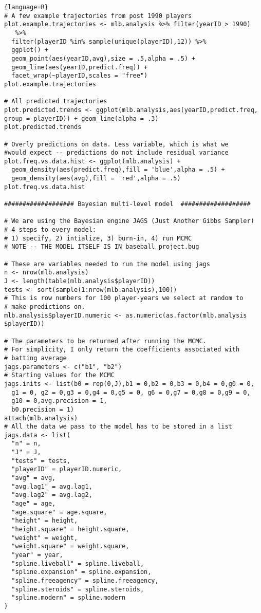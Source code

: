 \documentclass[10pt,a4paper]{article}
\begin{document}
\begin{lstlisting}{language=R}
# A few example trajectories from post 1990 players
plot.example.trajectories <- mlb.analysis %>% filter(yearID > 1990) 
   %>%
  filter(playerID %in% sample(unique(playerID),12)) %>%
  ggplot() +
  geom_point(aes(yearID,avg),size = .5,alpha = .5) +
  geom_line(aes(yearID,predict.freq)) +
  facet_wrap(~playerID,scales = "free")
plot.example.trajectories

# All predicted trajectories
plot.predicted.trends <- ggplot(mlb.analysis,aes(yearID,predict.freq, 
group = playerID)) + geom_line(alpha = .3) 
plot.predicted.trends

# Overly predictions on data. Less variable, which is what we 
#would expect -- predictions do not include residual variance
plot.freq.vs.data.hist <- ggplot(mlb.analysis) + 
  geom_density(aes(predict.freq),fill = 'blue',alpha = .5) +
  geom_density(aes(avg),fill = 'red',alpha = .5)
plot.freq.vs.data.hist

################### Bayesian multi-level model  ###################

# We are using the Bayesian engine JAGS (Just Another Gibbs Sampler)
# 4 steps to every model:
# 1) specify, 2) intialize, 3) burn-in, 4) run MCMC
# NOTE -- THE MODEL ITSELF IS IN baseball_project.bug

# These are variables needed to run the model using jags
n <- nrow(mlb.analysis)
J <- length(table(mlb.analysis$playerID))
tests <- sort(sample(1:nrow(mlb.analysis),100)) 
# This is row numbers for 100 player-years we select at random to 
# make predictions on.
mlb.analysis$playerID.numeric <- as.numeric(as.factor(mlb.analysis
$playerID))

# The parameters to be returned after running the MCMC. 
# For simplicity, I only return the coefficients associated with 
# batting average
jags.parameters <- c("b1", "b2") 
# Starting values for the MCMC
jags.inits <- list(b0 = rep(0,J),b1 = 0,b2 = 0,b3 = 0,b4 = 0,g0 = 0, 
  g1 = 0, g2 = 0,g3 = 0,g4 = 0,g5 = 0, g6 = 0,g7 = 0,g8 = 0,g9 = 0, 
  g10 = 0,avg.precision = 1, 
  b0.precision = 1)
attach(mlb.analysis)
# All the data we pass to the model has to be stored in a list
jags.data <- list(
  "n" = n,
  "J" = J,
  "tests" = tests,
  "playerID" = playerID.numeric,
  "avg" = avg,
  "avg.lag1" = avg.lag1,
  "avg.lag2" = avg.lag2,
  "age" = age,
  "age.square" = age.square,
  "height" = height,
  "height.square" = height.square,
  "weight" = weight,
  "weight.square" = weight.square,
  "year" = year,
  "spline.liveball" = spline.liveball,
  "spline.expansion" = spline.expansion,
  "spline.freeagency" = spline.freeagency,
  "spline.steroids" = spline.steroids,
  "spline.modern" = spline.modern
)


\end{lstlisting}
\end{document}
